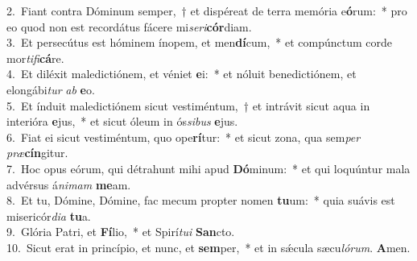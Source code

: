 {2.~}Fiant contra Dóminum semper,~† et dispéreat de terra memória e\textbf{ó}rum:~* pro eo quod non est recordátus fácere mi\textit{se}\textit{ri}\textbf{cór}diam.\\
{3.~}Et persecútus est hóminem ínopem, et men\textbf{dí}cum,~* et compúnctum corde mor\textit{ti}\textit{fi}\textbf{cá}re.\\
{4.~}Et diléxit maledictiónem, et véniet \textbf{e}i:~* et nóluit benedictiónem, et elongábi\textit{tur} \textit{ab} \textbf{e}o.\\
{5.~}Et índuit maledictiónem sicut vestiméntum,~† et intrávit sicut aqua in interióra \textbf{e}jus,~* et sicut óleum in ós\textit{si}\textit{bus} \textbf{e}jus.\\
{6.~}Fiat ei sicut vestiméntum, quo ope\textbf{rí}tur:~* et sicut zona, qua sem\textit{per} \textit{præ}\textbf{cín}gitur.\\
{7.~}Hoc opus eórum, qui détrahunt mihi apud \textbf{Dó}minum:~* et qui loquúntur mala advérsus á\textit{ni}\textit{mam} \textbf{me}am.\\
{8.~}Et tu, Dómine, Dómine, fac mecum propter nomen \textbf{tu}um:~* quia suávis est misericór\textit{di}\textit{a} \textbf{tu}a.\\
{9.~}Glória Patri, et \textbf{Fí}lio,~* et Spirí\textit{tu}\textit{i} \textbf{San}cto.\\
{10.~}Sicut erat in princípio, et nunc, et \textbf{sem}per,~* et in sǽcula sæcu\textit{ló}\textit{rum}. \textbf{A}men.\\
